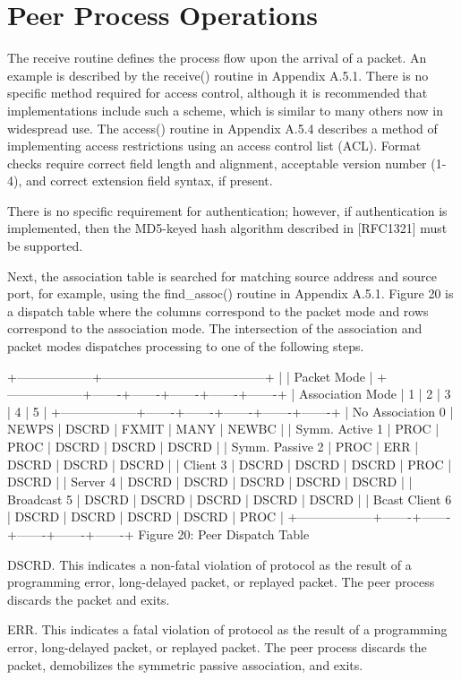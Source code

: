 \section{Peer Process Operations}

The receive routine defines the process flow upon the arrival of a
packet. An example is described by the receive() routine in
Appendix A.5.1. There is no specific method required for access
control, although it is recommended that implementations include such
a scheme, which is similar to many others now in widespread use. The
access() routine in Appendix A.5.4 describes a method of implementing
access restrictions using an access control list (ACL). Format
checks require correct field length and alignment, acceptable version
number (1-4), and correct extension field syntax, if present.

There is no specific requirement for authentication; however, if
authentication is implemented, then the MD5-keyed hash algorithm
described in [RFC1321] must be supported.

Next, the association table is searched for matching source address
and source port, for example, using the find\_assoc() routine in
Appendix A.5.1. Figure 20 is a dispatch table where the columns
correspond to the packet mode and rows correspond to the association
mode. The intersection of the association and packet modes
dispatches processing to one of the following steps.

+------------------+---------------------------------------+
| | Packet Mode |
+------------------+-------+-------+-------+-------+-------+
| Association Mode | 1 | 2 | 3 | 4 | 5 |
+------------------+-------+-------+-------+-------+-------+
| No Association 0 | NEWPS | DSCRD | FXMIT | MANY | NEWBC |
| Symm. Active 1 | PROC | PROC | DSCRD | DSCRD | DSCRD |
| Symm. Passive 2 | PROC | ERR | DSCRD | DSCRD | DSCRD |
| Client 3 | DSCRD | DSCRD | DSCRD | PROC | DSCRD |
| Server 4 | DSCRD | DSCRD | DSCRD | DSCRD | DSCRD |
| Broadcast 5 | DSCRD | DSCRD | DSCRD | DSCRD | DSCRD |
| Bcast Client 6 | DSCRD | DSCRD | DSCRD | DSCRD | PROC |
+------------------+-------+-------+-------+-------+-------+
Figure 20: Peer Dispatch Table

DSCRD. This indicates a non-fatal violation of protocol as the
result of a programming error, long-delayed packet, or replayed
packet. The peer process discards the packet and exits.

ERR. This indicates a fatal violation of protocol as the result of a
programming error, long-delayed packet, or replayed packet. The peer
process discards the packet, demobilizes the symmetric passive
association, and exits.

